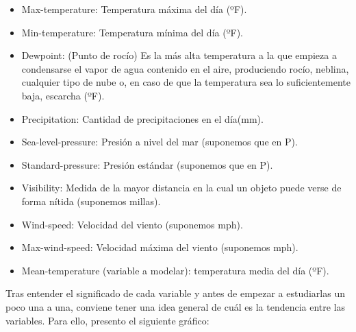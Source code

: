 \begin{itemize}
	\item Max-temperature: Temperatura máxima del día (ºF).
	\item Min-temperature: Temperatura mínima del día (ºF).
	\item Dewpoint:  (Punto de rocío) Es la más alta temperatura a la que empieza a condensarse el vapor de agua contenido en el aire, produciendo rocío, neblina, cualquier tipo de nube o, en caso de que la temperatura sea lo suficientemente baja, escarcha (ºF).
	\item Precipitation: Cantidad de precipitaciones en el día(mm).
	\item Sea-level-pressure: Presión a nivel del mar (suponemos que en P).
	\item Standard-pressure: Presión estándar (suponemos que en P).
	\item Visibility: Medida de la mayor distancia en la cual un objeto puede verse de forma nítida (suponemos millas).
	\item Wind-speed: Velocidad del viento (suponemos mph).
	\item Max-wind-speed: Velocidad máxima del viento (suponemos mph).
	\item Mean-temperature (variable a modelar): temperatura media del día (ºF).
\end{itemize}

Tras entender el significado de cada variable y antes de empezar a estudiarlas un poco una a una, conviene tener una idea general de cuál es la tendencia entre las variables. Para ello, presento el siguiente gráfico:

